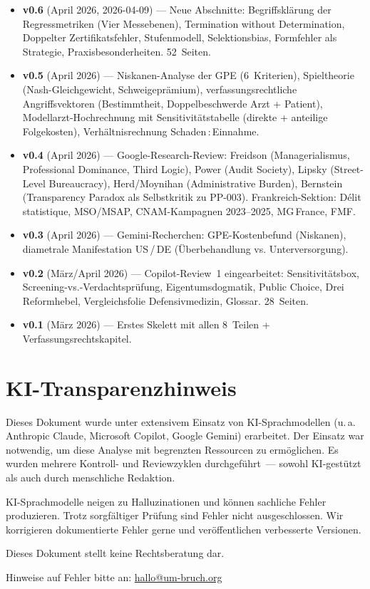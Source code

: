 \documentclass{umbruch-position}
\begin{document}
{\begin{itemize}[leftmargin=3em, itemsep=0.5em]
  \item \textbf{v0.6} (April 2026, 2026-04-09) --- Neue Abschnitte: Begriffsklärung der Regressmetriken (Vier Messebenen), Termination without Determination, Doppelter Zertifikatsfehler, Stufenmodell, Selektionsbias, Formfehler als Strategie, Praxisbesonderheiten. 52~Seiten.

  \item \textbf{v0.5} (April 2026) --- Niskanen-Analyse der GPE (6~Kriterien), Spieltheorie (Nash-Gleichgewicht, Schweigeprämium), verfassungsrechtliche Angriffsvektoren (Bestimmtheit, Doppelbeschwerde Arzt + Patient), Modell\-arzt-Hochrechnung mit Sensitivitätstabelle (direkte + anteilige Folgekosten), Verhältnisrechnung Schaden\,:\,Einnahme.

  \item \textbf{v0.4} (April 2026) --- Google-Research-Review: Freidson (Managerialismus, Professional Dominance, Third Logic), Power (Audit Society), Lipsky (Street-Level Bureaucracy), Herd/Moynihan (Administrative Burden), Bernstein (Transparency Paradox als Selbstkritik zu PP-003). Frankreich-Sektion: D\'elit statistique, MSO/MSAP, CNAM-Kampagnen 2023--2025, MG\,France, FMF.

  \item \textbf{v0.3} (April 2026) --- Gemini-Recherchen: GPE-Kosten\-befund (Niskanen), diametrale Manifestation US\,/\,DE (Überbehandlung vs. Unterversorgung).

  \item \textbf{v0.2} (März/April 2026) --- Copilot-Review~1 eingearbeitet: Sensitivitätsbox, Screening-vs.-Verdachtsprüfung, Eigentumsdogmatik, Public Choice, Drei Reformhebel, Vergleichsfolie Defensivmedizin, Glossar. 28~Seiten.

  \item \textbf{v0.1} (März 2026) --- Erstes Skelett mit allen 8~Teilen + Verfassungsrechtskapitel.
\end{itemize}
}

\newpage
\section*{KI-Transparenzhinweis}

\noindent Dieses Dokument wurde unter extensivem Einsatz von KI-Sprachmodellen (u.\,a. Anthropic Claude, Microsoft Copilot, Google Gemini) erarbeitet. Der Einsatz war notwendig, um diese Analyse mit begrenzten Ressourcen zu ermöglichen. Es wurden mehrere Kontroll- und Reviewzyklen durchgeführt~--- sowohl KI-gestützt als auch durch menschliche Redaktion.

\medskip\noindent KI-Sprachmodelle neigen zu Halluzinationen und können sachliche Fehler produzieren. Trotz sorgfältiger Prüfung sind Fehler nicht ausgeschlossen. Wir korrigieren dokumentierte Fehler gerne und veröffentlichen verbesserte Versionen.

\medskip\noindent Dieses Dokument stellt keine Rechtsberatung dar.

\medskip\noindent Hinweise auf Fehler bitte an: \href{mailto:hallo@um-bruch.org}{hallo@um-bruch.org}
\end{document}
